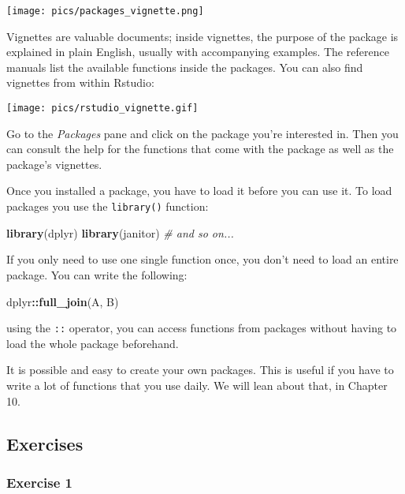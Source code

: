 \documentclass[
]{article}
\newenvironment{Shaded}{\begin{snugshade}}{\end{snugshade}}
\newcommand{\CommentTok}[1]{\textcolor[rgb]{0.56,0.35,0.01}{\textit{#1}}}
\newcommand{\KeywordTok}[1]{\textcolor[rgb]{0.13,0.29,0.53}{\textbf{#1}}}
\newcommand{\NormalTok}[1]{#1}
\newcommand{\OperatorTok}[1]{\textcolor[rgb]{0.81,0.36,0.00}{\textbf{#1}}}
\begin{document}
\texttt{[image: pics/packages\_vignette.png]}

Vignettes are valuable documents; inside vignettes, the purpose of the package is explained in
plain English, usually with accompanying examples. The reference manuals list the available functions
inside the packages. You can also find vignettes from within Rstudio:

\texttt{[image: pics/rstudio\_vignette.gif]}

Go to the \emph{Packages} pane and click on the package you're interested in. Then you can consult the
help for the functions that come with the package as well as the package's vignettes.

Once you installed a package, you have to load it before you can use it. To load packages you use the
\texttt{library()} function:

\begin{Shaded}
\begin{Highlighting}[]
\KeywordTok{library}\NormalTok{(dplyr)}
\KeywordTok{library}\NormalTok{(janitor)}
\CommentTok{\# and so on...}
\end{Highlighting}
\end{Shaded}

If you only need to use one single function once, you don't need to load an entire package. You can
write the following:

\begin{Shaded}
\begin{Highlighting}[]
\NormalTok{dplyr}\OperatorTok{::}\KeywordTok{full\_join}\NormalTok{(A, B)}
\end{Highlighting}
\end{Shaded}

using the \texttt{::} operator, you can access functions from packages without having to load the whole
package beforehand.

It is possible and easy to create your own packages. This is useful if you have to write a lot of
functions that you use daily. We will lean about that, in Chapter 10.

\hypertarget{exercises}{%
\subsection{Exercises}\label{exercises}}

\hypertarget{exercise-1}{%
\subsubsection*{Exercise 1}\label{exercise-1}}
\end{document}
